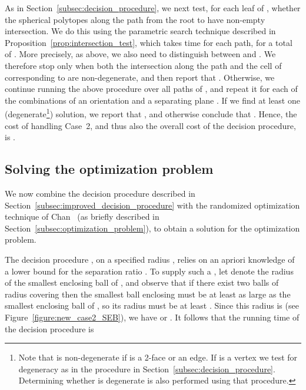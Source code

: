 \documentclass[a4paper,12pt]{article}
\begin{document}
As in Section~\ref{subsec:decision_procedure}, we next test, for
each leaf  of , whether the spherical polytopes along the
path from the root to  have non-empty intersection. We do this
using the parametric search technique described in
Proposition~\ref{prop:intersection_test}, which takes 
time for each path, for a total of . More
precisely, as above, we also need to distinguish between 
and . We therefore stop only when both the intersection
along the path and the cell of  corresponding to  are
non-degenerate, and then report that . Otherwise, we
continue running the above procedure over all paths of , and
repeat it for each of the  combinations of an
orientation  and a separating plane . If we find at
least one (degenerate\footnote{Note that  is non-degenerate if  is a 2-face or an edge. If
 is a vertex we test for degeneracy as in the procedure in
Section~\ref{subsec:decision_procedure}. Determining whether
 is degenerate is also
performed using that procedure.}) solution, we report that , and otherwise conclude that . Hence, the cost of handling Case~2, and thus also the overall
cost of the decision procedure, is .

\subsection{Solving the optimization problem}
\label{sec:separated_centers_optimization}

We now combine the decision procedure  described in Section~\ref{subsec:improved_decision_procedure} with the randomized optimization
technique of Chan~\cite{TCG} (as briefly described in Section~\ref{subsec:optimization_problem}),
to obtain a solution for the optimization problem.

The decision procedure , on a specified radius , relies on an apriori knowledge of a lower bound  for the separation ratio
. To supply such a , let  denote the radius of the smallest
enclosing ball of , and observe that if there exist two balls  of radius  covering  then the smallest ball  enclosing  must be at least as large as the smallest enclosing ball of , so its radius must be at least . Since this radius is
 (see Figure~\ref{figure:new_case2_SEB}), we have
 or .
It follows that the running time of the decision procedure  is
\end{document}
